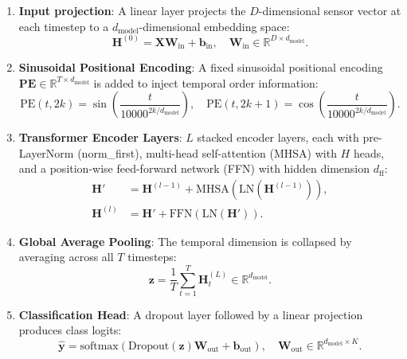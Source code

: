 \begin{enumerate}
    \item \textbf{Input projection}: A linear layer projects the $D$-dimensional sensor vector at each timestep to a $d_{\text{model}}$-dimensional embedding space:
    \begin{equation}
        \mathbf{H}^{(0)} = \mathbf{X} \mathbf{W}_{\text{in}} + \mathbf{b}_{\text{in}}, \quad \mathbf{W}_{\text{in}} \in \mathbb{R}^{D \times d_{\text{model}}}.
    \end{equation}

    \item \textbf{Sinusoidal Positional Encoding}: A fixed sinusoidal positional encoding $\mathbf{PE} \in \mathbb{R}^{T \times d_{\text{model}}}$ is added to inject temporal order information:
    \begin{equation}
        \text{PE}(t, 2k) = \sin\!\left(\frac{t}{10000^{2k/d_{\text{model}}}}\right), \quad \text{PE}(t, 2k+1) = \cos\!\left(\frac{t}{10000^{2k/d_{\text{model}}}}\right).
    \end{equation}

    \item \textbf{Transformer Encoder Layers}: $L$ stacked encoder layers, each with pre-LayerNorm (norm\_first), multi-head self-attention (MHSA) with $H$ heads, and a position-wise feed-forward network (FFN) with hidden dimension $d_{\text{ff}}$:
    \begin{align}
        \mathbf{H}' &= \mathbf{H}^{(l-1)} + \text{MHSA}\!\left(\text{LN}(\mathbf{H}^{(l-1)})\right), \\
        \mathbf{H}^{(l)} &= \mathbf{H}' + \text{FFN}\!\left(\text{LN}(\mathbf{H}')\right).
    \end{align}

    \item \textbf{Global Average Pooling}: The temporal dimension is collapsed by averaging across all $T$ timesteps:
    \begin{equation}
        \mathbf{z} = \frac{1}{T} \sum_{t=1}^{T} \mathbf{H}^{(L)}_t \in \mathbb{R}^{d_{\text{model}}}.
    \end{equation}

    \item \textbf{Classification Head}: A dropout layer followed by a linear projection produces class logits:
    \begin{equation}
        \hat{\mathbf{y}} = \text{softmax}(\text{Dropout}(\mathbf{z}) \mathbf{W}_{\text{out}} + \mathbf{b}_{\text{out}}), \quad \mathbf{W}_{\text{out}} \in \mathbb{R}^{d_{\text{model}} \times K}.
    \end{equation}
\end{enumerate}

